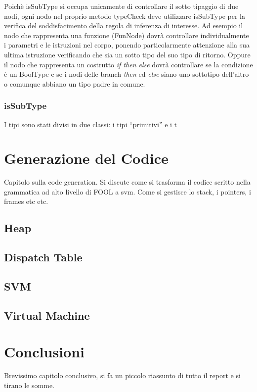 \documentclass{scrreprt}
\begin{document}
Poichè isSubType si occupa unicamente di controllare il sotto tipaggio di due nodi, ogni nodo nel proprio metodo typeCheck deve utilizzare isSubType per la verifica del soddisfacimento della
regola di inferenza di interesse. Ad esempio il nodo che rappresenta una funzione (FunNode) dovrà controllare individualmente i parametri e le istruzioni nel corpo, ponendo particolarmente attenzione alla sua ultima istruzione verificando che sia un sotto tipo del suo tipo di ritorno. 
Oppure il nodo che rappresenta un costrutto \textit{if then else} dovrà
controllare se la condizione è un BoolType e se i nodi delle branch \textit{then} ed \textit{else} siano uno sottotipo dell'altro o comunque abbiano un tipo padre in comune.

\subsection{isSubType}

I tipi sono stati divisi in due classi: i tipi ``primitivi'' e i t


\chapter{Generazione del Codice}
Capitolo sulla code generation. Si discute come si trasforma il codice scritto nella grammatica
ad alto livello di FOOL a svm. Come si gestisce lo stack, i pointers, i frames etc etc.
\section{Heap}
\section{Dispatch Table}
\section{SVM}
\section{Virtual Machine}

\chapter{Conclusioni}
Brevissimo capitolo conclusivo, si fa un piccolo riassunto di tutto il report e si tirano le somme.
\end{document}
